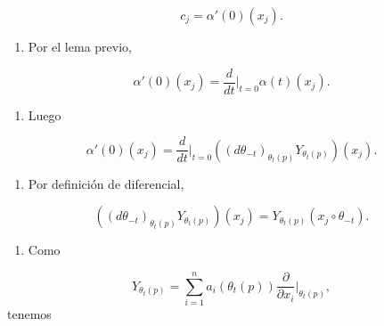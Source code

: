 \begin{bookproof}{}
\[
c_j=\alpha'(0)(x_j).
\]
\begin{enumerate}[start=19]
\item Por el lema previo,
\end{enumerate}
\[
\alpha'(0)(x_j)=\frac{d}{dt}\bigg|_{t=0}\alpha(t)(x_j).
\]
\begin{enumerate}[start=20]
\item Luego
\end{enumerate}
\[
\alpha'(0)(x_j)=\frac{d}{dt}\bigg|_{t=0}\left((d\theta_{-t})_{\theta_t(p)}Y_{\theta_t(p)}\right)(x_j).
\]
\begin{enumerate}[start=21]
\item Por definición de diferencial,
\end{enumerate}
\[
\left((d\theta_{-t})_{\theta_t(p)}Y_{\theta_t(p)}\right)(x_j)=Y_{\theta_t(p)}(x_j\circ\theta_{-t}).
\]
\begin{enumerate}[start=22]
\item Como
\end{enumerate}
\[
Y_{\theta_t(p)}=\sum_{i=1}^n a_i(\theta_t(p))\frac{\partial}{\partial x_i}\bigg|_{\theta_t(p)},
\]
tenemos


\end{bookproof}
